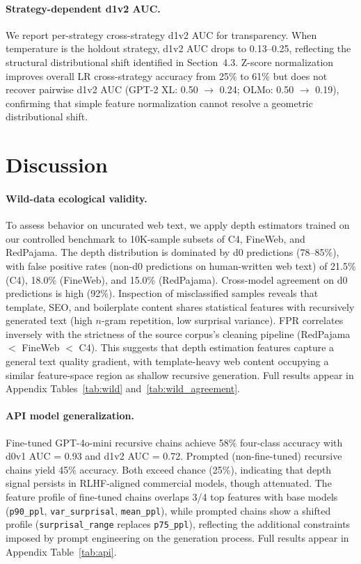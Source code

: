 \documentclass[11pt,a4paper]{article}
\begin{document}
\paragraph{Strategy-dependent d1v2 AUC.}
We report per-strategy cross-strategy d1v2 AUC for transparency. When temperature is the holdout strategy, d1v2 AUC drops to 0.13--0.25, reflecting the structural distributional shift identified in Section~4.3. Z-score normalization improves overall LR cross-strategy accuracy from 25\% to 61\% but does not recover pairwise d1v2 AUC (GPT-2 XL: 0.50 $\to$ 0.24; OLMo: 0.50 $\to$ 0.19), confirming that simple feature normalization cannot resolve a geometric distributional shift.

\section{Discussion}

\paragraph{Wild-data ecological validity.}
To assess behavior on uncurated web text, we apply depth estimators trained on our controlled benchmark to 10K-sample subsets of C4, FineWeb, and RedPajama. The depth distribution is dominated by d0 predictions (78--85\%), with false positive rates (non-d0 predictions on human-written web text) of 21.5\% (C4), 18.0\% (FineWeb), and 15.0\% (RedPajama). Cross-model agreement on d0 predictions is high (92\%). Inspection of misclassified samples reveals that template, SEO, and boilerplate content shares statistical features with recursively generated text (high $n$-gram repetition, low surprisal variance). FPR correlates inversely with the strictness of the source corpus's cleaning pipeline (RedPajama $<$ FineWeb $<$ C4). This suggests that depth estimation features capture a general text quality gradient, with template-heavy web content occupying a similar feature-space region as shallow recursive generation. Full results appear in Appendix Tables~\ref{tab:wild} and~\ref{tab:wild_agreement}.

\paragraph{API model generalization.}
Fine-tuned GPT-4o-mini recursive chains achieve 58\% four-class accuracy with d0v1 AUC = 0.93 and d1v2 AUC = 0.72. Prompted (non-fine-tuned) recursive chains yield 45\% accuracy. Both exceed chance (25\%), indicating that depth signal persists in RLHF-aligned commercial models, though attenuated. The feature profile of fine-tuned chains overlaps 3/4 top features with base models (\texttt{p90\_ppl}, \texttt{var\_surprisal}, \texttt{mean\_ppl}), while prompted chains show a shifted profile (\texttt{surprisal\_range} replaces \texttt{p75\_ppl}), reflecting the additional constraints imposed by prompt engineering on the generation process. Full results appear in Appendix Table~\ref{tab:api}.
\end{document}
